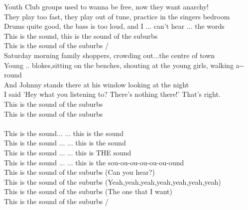  Youth Club groups used to  wanna be free,  now they want  anarchy!\\
They  play too fast, they  play out of tune,  practice in the  singers bedroom\\
 Drums quite good, the bass is too loud, and  I ... can't hear ... the  words\\
This is the  sound, this is the  sound of the  suburbs\\
 This is the  sound of the  suburbs  /  \\
 Saturday morning family shoppers, crowding out...the centre of  town\\
 Young .. blokes,sitting on the benches, shouting at the young girls, walking a--round\\
 And Johnny  stands there at his  window looking at the night\\
I said 'Hey what you  listening to? There's  nothing there!'  That's right.\\
 This is the  sound of the  suburbs\\
 This is the  sound of the  suburbs\\
       \\
This is the  sound... ... this is the  sound\\
This is the  sound ...  ... this is the  sound\\
This is the  sound ...  ... this is THE  sound\\
This is the  sound ...  ... this is the  sou-ou-ou-ou-ou-ou-ound\\
 This is the  sound of the  suburbs  (Can you hear?)\\
 This is the  sound of the  suburbs  (Yeah,yeah,yeah,yeah,yeah,yeah,yeah)\\
 This is the  sound of the  suburbs  (The one that I want)\\
 This is the  sound of the  suburbs  /  \\
